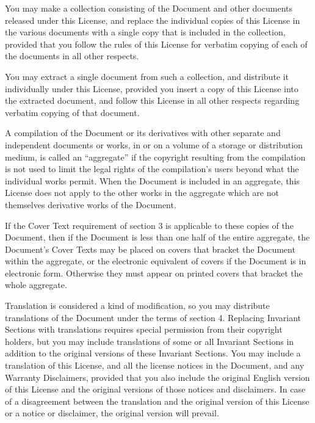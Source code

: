 \documentclass[letterpaper,10pt,english,openany,oneside]{sphinxmanual}
\begin{document}
\sphinxAtStartPar
{}

\sphinxAtStartPar
You may make a collection consisting of the Document and other documents
released under this License, and replace the individual copies of this
License in the various documents with a single copy that is included in
the collection, provided that you follow the rules of this License for
verbatim copying of each of the documents in all other respects.

\sphinxAtStartPar
You may extract a single document from such a collection, and distribute
it individually under this License, provided you insert a copy of this
License into the extracted document, and follow this License in all
other respects regarding verbatim copying of that document.

\sphinxAtStartPar
{}

\sphinxAtStartPar
A compilation of the Document or its derivatives with other separate and
independent documents or works, in or on a volume of a storage or
distribution medium, is called an “aggregate” if the copyright resulting
from the compilation is not used to limit the legal rights of the
compilation’s users beyond what the individual works permit. When the
Document is included in an aggregate, this License does not apply to the
other works in the aggregate which are not themselves derivative works
of the Document.

\sphinxAtStartPar
If the Cover Text requirement of section 3 is applicable to these copies
of the Document, then if the Document is less than one half of the
entire aggregate, the Document’s Cover Texts may be placed on covers
that bracket the Document within the aggregate, or the electronic
equivalent of covers if the Document is in electronic form. Otherwise
they must appear on printed covers that bracket the whole aggregate.

\sphinxAtStartPar
{}

\sphinxAtStartPar
Translation is considered a kind of modification, so you may distribute
translations of the Document under the terms of section 4. Replacing
Invariant Sections with translations requires special permission from
their copyright holders, but you may include translations of some or all
Invariant Sections in addition to the original versions of these
Invariant Sections. You may include a translation of this License, and
all the license notices in the Document, and any Warranty Disclaimers,
provided that you also include the original English version of this
License and the original versions of those notices and disclaimers. In
case of a disagreement between the translation and the original version
of this License or a notice or disclaimer, the original version will
prevail.
\end{document}
